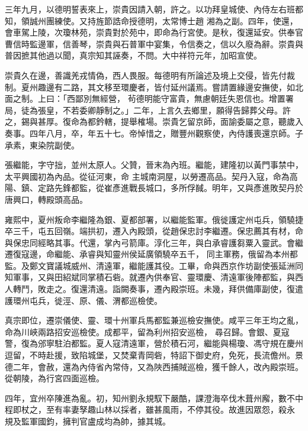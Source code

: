\begin{pinyinscope}
 三年九月，以德明誓表來上，崇貴因請入朝，許之。以功拜皇城使、內侍左右班都知，領誠州團練使。又持旌節誥命授德明，太常博士趙
 湘為之副。四年，使還，會車駕上陵，次瓊林苑，崇貴對於苑中，即命為行宮使。是秋，復還延安。供奉官曹信時監邊軍，信善琴，崇貴與石普軍中宴集，令信奏之，信以久廢為辭。崇貴與普因摭其他過以聞，真宗知其誣奏，不問。大中祥符元年，加昭宣使。



 崇貴久在邊，善識羌戎情偽，西人畏服。每德明有所論述及境上交侵，皆先付裁制。夏州趣邊有二路，其文移至環慶者，皆付延州議焉。嘗請置緣邊安撫使，如北面之制。上曰：「西鄙別無經營，
 茍德明能守富貴，無慮朝廷失恩信也。增置署局，徒為張皇，不若委卿靜制之。」二年，上言久去鄉里，願得告歸葬父母。許之，錫與甚厚。復命為都鈐轄，提舉榷場。崇貴乞留京師，面諭委屬之意，聽歲入奏事。四年八月，卒，年五十七。帝悼惜之，贈豐州觀察使，內侍護喪還京師。子承素，東染院副使。



 張繼能，字守拙，並州太原人。父贊，晉末為內班。繼能，建隆初以黃門事禁中，太平興國初為內品。從征河東，命
 主城南洞屋，以勞遷高品。契丹入寇，命為高陽、鎮、定路先鋒都監，從崔彥進戰長城口，多所俘馘。明年，又與彥進敗契丹於唐興口，轉殿頭高品。



 雍熙中，夏州叛命李繼隆為銀、夏都部署，以繼能監軍。俄徙護定州屯兵，領驍捷卒三千，屯五回嶺。端拱初，遷入內殿頭，從趙保忠討李繼遷。保忠薦其有材，命與保忠同經略其事。代還，掌內弓箭庫。淳化三年，與白承睿護芻粟入靈武。會繼遷復寇邊，命繼能、承睿與知靈州侯延廣領驍卒五千，
 同主軍務，俄留為本州都監。及鄭文寶議城威州、清遠軍，繼能護其役。工畢，命與西京作坊副使張延洲同知軍事，又與田紹斌同掌積石砦。就遷內供奉官、靈環慶、清遠軍後陣都監，與西人轉鬥，敗走之。復還清遠。詣闕奏事，遷內殿崇班。未幾，拜供備庫副使，復遣護環州屯兵，徙涇、原、儀、渭都巡檢使。



 真宗即位，遷崇儀使、靈、環十州軍兵馬都監兼巡檢安撫使。咸平三年王均之亂，命為川峽兩路招安巡檢使。成都平，留為利州招安巡檢，
 尋召歸。會銀、夏寇警，復為邠寧駐泊都監。夏人寇清遠軍，營於積石河，繼能與楊瓊、馮守規在慶州逗留，不時赴援，致陷城堡，又焚棄青岡砦，特詔下御史府，免死，長流儋州。景德二年，會赦，還為內侍省內常侍，又為陜西捕賊巡檢，獲千餘人，改內殿崇班。從朝陵，為行宮四面巡檢。



 四年，宜州卒陳進為亂。初，知州劉永規馭下嚴酷，課澄海卒伐木葺州廨，數不中程即杖之，至有率妻孥趣山林以採者，雖甚風雨，不停其役。故進因眾怨，殺永
 規及監軍國鈞，擁判官盧成均為帥，據其城。




\end{pinyinscope}
